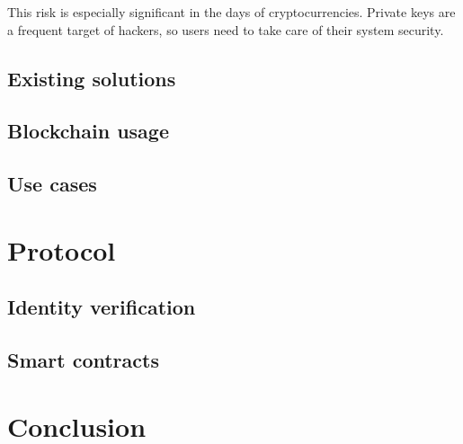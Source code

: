 \documentclass[9pt,oneside]{amsart}
\begin{document}
\begin{multicols}{2}
This risk is especially significant in the days of cryptocurrencies.
Private keys are a frequent target of hackers, so users need to take care of their system security.

\subsection{Existing solutions}

\subsection{Blockchain usage}

\subsection{Use cases}


\section{Protocol}

\subsection{Identity verification}

\subsection{Smart contracts}


\section{Conclusion}

\end{multicols}
\end{document}
